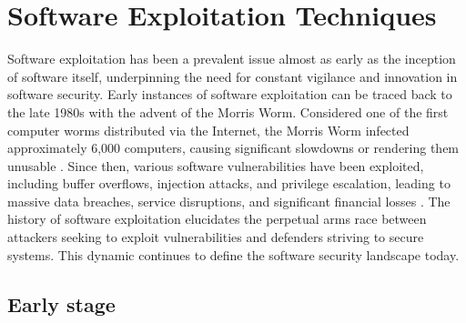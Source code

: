 \documentclass{article}
\begin{document}

\section{Software Exploitation Techniques}%
Software exploitation has been a prevalent issue almost as early as the inception of software itself, underpinning the need for constant vigilance and innovation in software security. Early instances of software exploitation can be traced back to the late 1980s with the advent of the Morris Worm. Considered one of the first computer worms distributed via the Internet, the Morris Worm infected approximately 6,000 computers, causing significant slowdowns or rendering them unusable \cite{spafford1989internet}. Since then, various software vulnerabilities have been exploited, including buffer overflows, injection attacks, and privilege escalation, leading to massive data breaches, service disruptions, and significant financial losses \cite{owasp2017}. The history of software exploitation elucidates the perpetual arms race between attackers seeking to exploit vulnerabilities and defenders striving to secure systems. This dynamic continues to define the software security landscape today.

\subsection{Early stage}
\end{document}
